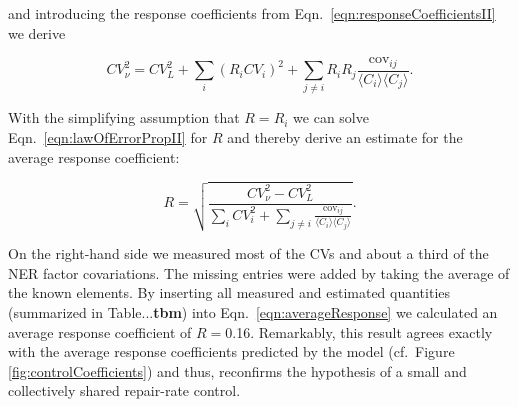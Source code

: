 and introducing the response coefficients from Eqn.\ \ref{eqn:responseCoefficientsII} we derive

\begin{equation}
	CV_{\nu}^2 = CV_{L}^2 + \sum_{i}(R_iCV_i)^2 + \sum_{j\neq i} R_iR_j \frac{\textrm{cov}_{ij}}{\langle C_i \rangle\langle C_j\rangle}.
	\label{eqn:lawOfErrorPropII}
\end{equation}

With the simplifying assumption that $R = R_i$ we can solve Eqn.\ \ref{eqn:lawOfErrorPropII} for $R$ and thereby derive an estimate for the average response coefficient:

\begin{equation}
	R = \sqrt{	\frac{CV_{\nu}^2 - CV_L^2}{\sum_{i} CV_i^2 + \sum_{j\neq i} \frac{\textrm{cov}_{ij}}{\langle C_i \rangle\langle C_j\rangle}}}.
	\label{eqn:averageResponse}
\end{equation} 

On the right-hand side we measured most of the CVs and about a third of the NER factor covariations. The missing entries were added by taking the average of the known elements. By inserting all measured and estimated quantities (summarized in Table...\textbf{tbm}) into Eqn.\ \ref{eqn:averageResponse} we calculated an average response coefficient of $R =$0.16. Remarkably, this result agrees exactly with the average response coefficients predicted by the model (cf.\ Figure \ref{fig:controlCoefficients}) and thus, reconfirms the hypothesis of a small and collectively shared repair-rate control.    



